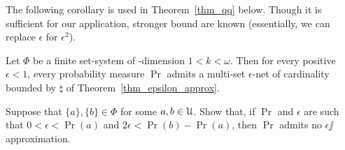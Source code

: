 \documentclass[sputnik.tex]{subfiles}
\begin{document}
The following corollary is used in Theorem~\ref{thm_qq} below.
Though it is sufficient for our application, stronger bound are known (essentially, we can replace $\epsilon$ for $\epsilon^2$).



\begin{corollary}\label{coroll_epsilon_net}
Let $\Phi$ be a finite set-system of \vc-dimension $1<k<\omega$.
Then for every positive $\epsilon<1$, every probability measure $\Pr$ admits a multi-set $\epsilon$-net of cardinality bounded by $\natural$ of Theorem~\ref{thm_epsilon_approx}.
\end{corollary}

\begin{exercise}\label{ex_counterexample}
Suppose that $\{a\},\{b\}\in\Phi$ for some $a,b\in\EuScript U$.
Show that, if $\Pr$ and $\epsilon$ are such that $0<\epsilon<\Pr(a)$ and $2\epsilon<\Pr(b)-\Pr(a)$, then $\Pr$ admits no $\epsilon\jj$approximation.\QED
\end{exercise}



 
\end{document}
